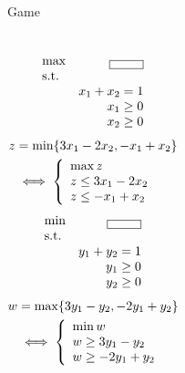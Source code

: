 \begin{frame}{Game}
  \begin{columns}
	  \begin{equation*}
		\setlength\arraycolsep{2.5pt}
		\begin{array}{l@{\quad}r}
		  \max &	\boxed{\qquad}	\\
		  \text{s.t.}	&	\\
		  		&	x_1 + x_2 = 1 \\
				&	x_1 \geq 0	\\
				&	x_2 \geq 0
		\end{array}
	  \end{equation*}
	  \begin{align*}
		z &= \min \{3x_1 - 2x_2, -x_1 + x_2\} \\
		&\iff \left\{\begin{array}{l}
		  \max z \\
		  z \leq 3x_1 - 2x_2 \\
		  z \leq -x_1 + x_2
		\end{array}\right.
	  \end{align*}
	  \begin{equation*}
		\setlength\arraycolsep{2.5pt}
		\begin{array}{l@{\quad}r}
		  \min &	\boxed{\qquad}	\\
		  \text{s.t.}	&	\\
		  		&	y_1 + y_2 = 1 \\
				&	y_1 \geq 0	\\
				&	y_2 \geq 0
		\end{array}
	  \end{equation*}
	  \begin{align*}
		w &= \max \{3y_1 - y_2, -2y_1 + y_2\} \\
		&\iff \left\{\begin{array}{l}
		  \min w \\
		  w \geq 3y_1 - y_2 \\
		  w \geq -2y_1 + y_2
		\end{array}\right.
	  \end{align*}
  \end{columns}
\end{frame}
